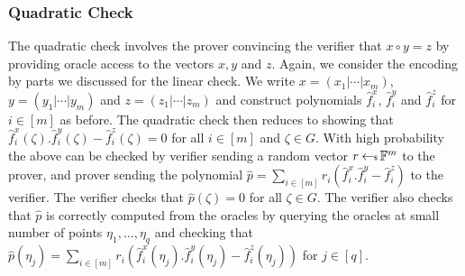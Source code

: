 \subsubsection{Quadratic Check}
The quadratic check involves the prover convincing the verifier that $x\circ y=z$ by providing oracle access to the vectors $x,y$ and $z$. Again, we
consider the encoding by parts we discussed for the linear check. We write $x=(x_1|\cdots|x_m)$, $y=(y_1|\cdots|y_m)$ and $z=(z_1|\cdots|z_m)$ and
construct polynomials $\hat{f}^x_i$, $\hat{f}^y_i$ and $\hat{f}^z_i$ for $i\in [m]$ as before. The quadratic check then reduces to showing that
$\hat{f}^x_i(\zeta).\hat{f}^y_i(\zeta)-\hat{f}^z_i(\zeta)=0$ for all $i\in [m]$ and $\zeta\in G$. With high probability the above can be checked by
verifier sending a random vector $r\hskip2.3pt{\gets\!\!\mbox{\tiny${\$}$\normalsize}}\, \mathbb{F}^m$ to the prover, and prover sending the polynomial $\hat{p}=\sum_{i\in [m] } r_i (\hat{f}^x_i .\hat{f}^y_i - \hat{f}^z_i)$ to the verifier. The verifier checks that $\hat{p}(\zeta)=0$ for all $\zeta\in G$. The verifier also checks that $\hat{p}$ is correctly computed from the oracles by querying the oracles at small number of points $\eta_1,\ldots,\eta_q$ and checking that $\hat{p}(\eta_j)=\sum_{i\in [m]}r_i(\hat{f}^x_i(\eta_j).\hat{f}^y_i(\eta_j)-\hat{f}^z_i(\eta_j))$ for $j\in [q]$.
